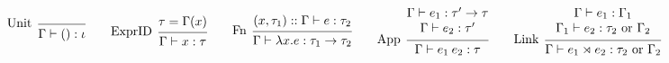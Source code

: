 \documentclass{article}
\theoremstyle{definition}
\newcommand*{\cons}{::}
\newcommand*{\link}[2]{{#1}\rtimes{#2}}
\begin{document}
\begin{figure}[h!]
  \footnotesize
  \begin{flushright}
  \end{flushright}
  \centering
  \vspace{0pt} %
  \[
    \begin{prooftree}
      \infer[left label=Unit]0{
      \Gamma\vdash():\iota
      }
    \end{prooftree}\qquad
    \begin{prooftree}
      \hypo{\tau=\Gamma(x)}
      \infer[left label=ExprID]1{
      \Gamma\vdash x:\tau
      }
    \end{prooftree}\qquad
    \begin{prooftree}
      \hypo{(x,\tau_1)\cons\Gamma\vdash e:\tau_2}
      \infer[left label=Fn]1{
      \Gamma\vdash\lambda x.e:\tau_1\rightarrow\tau_2
      }
    \end{prooftree}\qquad
    \begin{prooftree}
      \hypo{
        \begin{matrix}
          \Gamma\vdash e_1:\tau'\rightarrow\tau \\
          \Gamma\vdash e_2:\tau'
        \end{matrix}
      }
      \infer[left label={App}]1{
      \Gamma\vdash e_{1}\:e_{2}:\tau
      }
    \end{prooftree}\qquad
    \begin{prooftree}
      \hypo{
        \begin{matrix}
          \Gamma\vdash e_1:\Gamma_1 \\
          \Gamma_1\vdash e_2:\tau_2\text{ or }\Gamma_2
        \end{matrix}
      }
      \infer[left label=Link]1{
      \Gamma\vdash\link{e_{1}}{e_{2}}:\tau_2\text{ or }\Gamma_2
      }
    \end{prooftree}
  \]


\end{figure}
\end{document}
